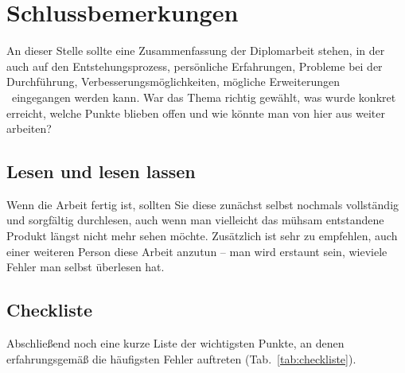 \chapter{Schlussbemerkungen}
\label{cha:Schluss}

An dieser Stelle sollte eine Zusammenfassung der Diplomarbeit
stehen, in der auch auf den Entstehungsprozess, persönliche
Erfahrungen, Probleme bei der Durchführung,
Verbesserungsmöglichkeiten, mögliche %
Erweiterungen \usw\ eingegangen werden kann. War das Thema richtig
gewählt, was wurde konkret erreicht, welche Punkte blieben offen
und wie könnte man von hier aus weiter arbeiten?


\section{Lesen und lesen lassen}

Wenn die Arbeit fertig ist, sollten Sie diese zunächst selbst nochmals
vollständig und sorgfältig durchlesen, auch wenn man vielleicht das mühsam
entstandene Produkt längst nicht mehr sehen möchte. Zusätzlich ist sehr zu empfehlen, auch einer weiteren Person diese Arbeit anzutun -- man wird erstaunt sein, wieviele Fehler man selbst überlesen hat.



\section{Checkliste}

Abschließend noch eine kurze Liste der wichtigsten Punkte, an denen
erfahrungsgemäß die häufigsten Fehler auftreten (Tab.\ \ref{tab:checkliste}).


